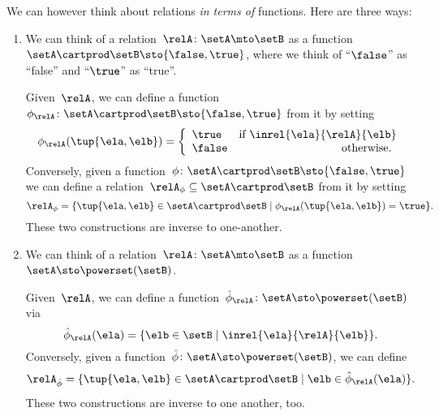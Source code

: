 \begin{remark}
	\label{re:rel-three-fun-descriptions}
	We can however think about relations \emph{in terms of} functions.
	Here are three ways:
	\begin{enumerate}
		\item We can think of a relation~$\relA \colon \setA \mto\setB$ as a function~$\setA \cartprod \setB \sto \{ \false, \true \}$, where we think of ``$\false$'' as ``false'' and ``$\true$'' as ``true''.

		      Given~$\relA$, we can define a function~$\phi_{\relA} \colon \setA \cartprod \setB \sto \{ \false, \true \}$ from it by setting
		      \begin{equation}
			      \phi_{\relA}(\tup{\ela, \elb}) =
			      \left
			      \{\begin{array}{lr}
				      \true  & \text{if } \inrel{\ela}{\relA}{\elb} \\
				      \false & \text{otherwise.
				      }
			      \end{array}
			      \right.
		      \end{equation}
		      Conversely, given a function~$\phi\colon \setA \cartprod \setB \sto \{ \false, \true \}$ we can define a relation~$\relA_{\phi} \subseteq \setA \cartprod \setB$ from it by setting
		      \begin{equation}
			      \relA_{\phi} = \{ \tup{\ela, \elb} \in \setA \cartprod \setB \mid \phi_{\relA}(\tup{\ela, \elb}) = \true \}.
		      \end{equation}
		      These two constructions are inverse to one-another.

		\item We can think of a relation~$\relA \colon \setA \mto \setB$ as a function~$\setA  \sto \powerset (\setB)$.

		      Given~$\relA$, we can define a function~$\hat \phi_{\relA} \colon \setA \sto \powerset (\setB)$ via
		      \begin{equation}
			      \hat \phi_{\relA} (\ela) = \{ \elb \in \setB \mid \inrel{\ela}{\relA}{\elb}\}.
		      \end{equation}
		      Conversely, given a function~$\hat \phi \colon \setA \sto \powerset (\setB)$, we can define
		      \begin{equation}
			      \relA_{\hat \phi} = \{ \tup{\ela, \elb} \in \setA \cartprod \setB \mid \elb \in \hat \phi_{\relA}(\ela)   \}.
		      \end{equation}
		      These two constructions are inverse to one another, too.


\end{enumerate}
\end{remark}
